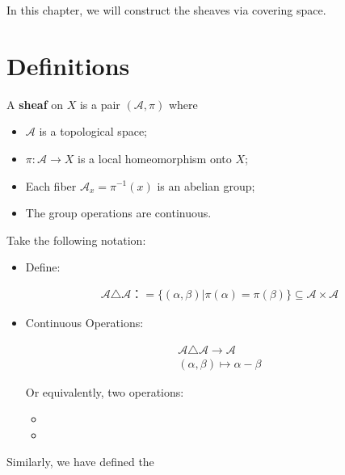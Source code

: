 \documentclass[Total.tex]{subfiles}
\begin{document}
		In this chapter, we will construct the sheaves via covering space.
		
		\section{Definitions}
		
		\begin{Def}
			A \textbf{sheaf} on $X$ is a pair $(\mathcal{A},\pi)$ where
			
			\begin{itemize}
				\item $\mathcal{A}$ is a topological space;
				\item $\pi:\mathcal{A}\rightarrow X$ is a local homeomorphism onto $X$;
				\item Each fiber $\mathcal{A}_x=\pi^{-1}(x)$ is an abelian group;
				\item The group operations are continuous. 
			\end{itemize}
		\end{Def}
		
		\begin{Def}
			Take the following notation:
			
			\begin{itemize}
				\item Define:
				
				\begin{gather*}
					\mathcal{A}\triangle \mathcal{A}：=\{(\alpha,\beta)|\pi(\alpha)=\pi(\beta)\}\subseteq \mathcal{A}\times \mathcal{A}
				\end{gather*}
				\item Continuous Operations:
				
				\begin{gather*}
					\mathcal{A}\triangle \mathcal{A}\rightarrow \mathcal{A}\\
					(\alpha,\beta)\mapsto \alpha-\beta
				\end{gather*}
				
				Or equivalently, two operations:
				
				\begin{itemize}
					\item 
					\item 
				\end{itemize}
			\end{itemize}
		\end{Def}
		
		Similarly, we have defined the 
		
\end{document}
